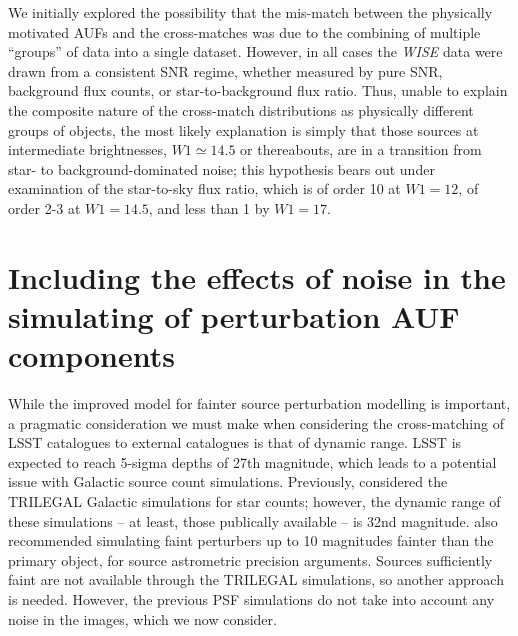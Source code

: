 \documentclass[fleqn,usenatbib]{mnras}
\begin{document}
We initially explored the possibility that the mis-match between the physically motivated AUFs and the cross-matches was due to the combining of multiple ``groups'' of data into a single dataset. However, in all cases the \textit{WISE} data were drawn from a consistent SNR regime, whether measured by pure SNR, background flux counts, or star-to-background flux ratio. Thus, unable to explain the composite nature of the cross-match distributions as physically different groups of objects, the most likely explanation is simply that those sources at intermediate brightnesses, $W1\simeq14.5$ or thereabouts, are in a transition from star- to background-dominated noise; this hypothesis bears out under examination of the star-to-sky flux ratio, which is of order 10 at $W1=12$, of order 2-3 at $W1=14.5$, and less than 1 by $W1=17$.

\section{Including the effects of noise in the simulating of perturbation AUF components}
\label{sec:noise effects}
While the improved model for fainter source perturbation modelling is important, a pragmatic consideration we must make when considering the cross-matching of LSST catalogues to external catalogues is that of dynamic range. LSST is expected to reach 5-sigma depths of 27th magnitude, which leads to a potential issue with Galactic source count simulations. Previously, \citet{2018MNRAS.481.2148W} considered the TRILEGAL \citep{Girardi2005} Galactic simulations for star counts; however, the dynamic range of these simulations -- at least, those publically available -- is 32nd magnitude. \citet{2018MNRAS.481.2148W} also recommended simulating faint perturbers up to 10 magnitudes fainter than the primary object, for source astrometric precision arguments. Sources sufficiently faint are not available through the TRILEGAL simulations, so another approach is needed. However, the previous PSF simulations do not take into account any noise in the images, which we now consider.
\end{document}
